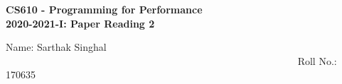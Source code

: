 \documentclass[20pt]{letter}
\begin{document}
\begin{center}
{\LARGE \textbf{
CS610 - Programming for Performance\\
2020-2021-I: Paper Reading 2
}}\end{center}

{\Large
Name: Sarthak Singhal        ~~~~~~~~~~~~~~~~~~~~~~~~~~~~~~~~~~~~~~~~~~~~~~~~~~~~~~~~~~   Roll No.: 170635\\\\}



\end{document}
